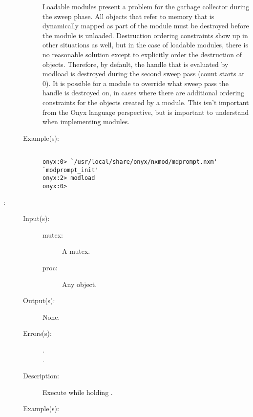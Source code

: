 \begin{description}
\begin{description}
		Loadable modules present a problem for the garbage collector
		during the sweep phase.  All objects that refer to memory that
		is dynamically mapped as part of the module must be destroyed
		before the module is unloaded.  Destruction ordering constraints
		show up in other situations as well, but in the case of loadable
		modules, there is no reasonable solution except to explicitly
		order the destruction of objects.  Therefore, by default, the
		handle that is evaluated by modload is destroyed during the
		second sweep pass (count starts at 0).  It is possible for a
		module to override what sweep pass the handle is destroyed on,
		in cases where there are additional ordering constraints for the
		objects created by a module.  This isn't important from the Onyx
		language perspective, but is important to understand when
		implementing modules.
	\item[Example(s): ]\begin{verbatim}

onyx:0> `/usr/local/share/onyx/nxmod/mdprompt.nxm' `modprompt_init'
onyx:2> modload
onyx:0>
	\end{verbatim}
	\end{description}
\label{systemdict:monitor}
\item[{\onyxop{mutex proc}{monitor}{--}}: ]
	\begin{description}\item[]
	\item[Input(s): ]
		\begin{description}\item[]
		\item[mutex: ]
			A mutex.
		\item[proc: ]
			Any object.
		\end{description}
	\item[Output(s): ] None.
	\item[Errors(s): ]
		\begin{description}\item[]
		\item[.]
		\item[.]
		\end{description}
	\item[Description: ]
		Execute  while holding .
	\item[Example(s): ]\begin{verbatim}


\end{verbatim}
\end{description}
\end{description}
